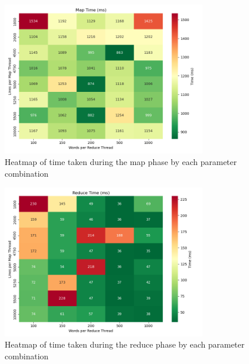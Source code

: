 \documentclass[a4paper]{article}
\begin{document}
\begin{figure}[H]
    \centering
    \includegraphics[width=0.8\textwidth]{./images/map_time_heatmap.png}
    \caption{Heatmap of time taken during the map phase by each parameter combination}
\end{figure}

\begin{figure}[H]
    \centering
    \includegraphics[width=0.8\textwidth]{./images/reduce_time_heatmap.png}
    \caption{Heatmap of time taken during the reduce phase by each parameter combination}
\end{figure}
\end{document}
